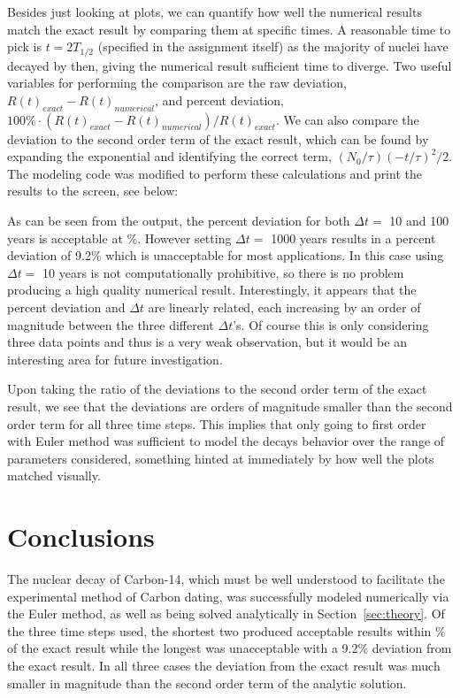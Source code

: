\documentclass[notitlepage,aps,prd,nofootinbib]{revtex4-1}
\begin{document}
Besides just looking at plots, we can quantify how well the numerical results match the exact result by comparing them at specific times. A reasonable time to pick is $t = 2T_{1/2}$ (specified in the assignment itself) as the majority of nuclei have decayed by then, giving the numerical result sufficient time to diverge. Two useful variables for performing the comparison are the raw deviation, $R\left(t\right)_{exact}-R\left(t\right)_{numerical}$, and percent deviation, $100\%\cdot\left(R\left(t\right)_{exact}-R\left(t\right)_{numerical}\right)/R\left(t\right)_{exact}$. We can also compare the deviation to the second order term of the exact result, which can be found by expanding the exponential and identifying the correct term, $\left(N_{0}/\tau\right) \left(-t/\tau\right)^2/2$. The modeling code was modified to perform these calculations and print the results to the screen, see below: %
\newline


As can be seen from the output, the percent deviation for both $\Delta t =$ 10 and 100 years is acceptable at \%. However setting $\Delta t =$ 1000 years results in a percent deviation of 9.2\% which is unacceptable for most applications. In this case using $\Delta t =$ 10 years is not computationally prohibitive, so there is no problem producing a high quality numerical result. Interestingly, it appears that the percent deviation and $\Delta t$ are linearly related, each increasing by an order of magnitude between the three different $\Delta t$'s. Of course this is only considering three data points and thus is a very weak observation, but it would be an interesting area for future investigation.

Upon taking the ratio of the deviations to the second order term of the exact result, we see that the deviations are orders of magnitude smaller than the second order term for all three time steps. This implies that only going to first order with Euler method was sufficient to model the decays behavior over the range of parameters considered, something hinted at immediately by how well the plots matched visually.

\section{Conclusions}
\label{sec:Conclusions}
The nuclear decay of Carbon-14, which must be well understood to facilitate the experimental method of Carbon dating, was successfully modeled numerically via the Euler method, as well as being solved analytically in Section~\ref{sec:theory}. Of the three time steps used, the shortest two produced acceptable results within \% of the exact result while the longest was unacceptable with a 9.2\% deviation from the exact result. In all three cases the deviation from the exact result was much smaller in magnitude than the second order term of the analytic solution.
\end{document}
